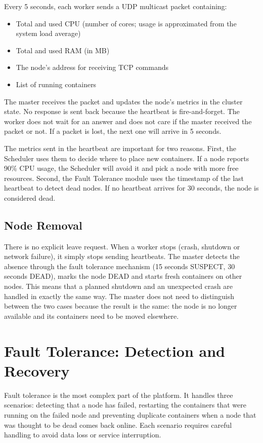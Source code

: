 Every 5 seconds, each worker sends a UDP multicast packet containing:
\begin{itemize}
    \item Total and used CPU (number of cores; usage is approximated from the system load average)
    \item Total and used RAM (in MB)
    \item The node's address for receiving TCP commands
    \item List of running containers
\end{itemize}

The master receives the packet and updates the node's metrics in the cluster state. No response is sent back because the heartbeat is fire-and-forget. The worker does not wait for an answer and does not care if the master received the packet or not. If a packet is lost, the next one will arrive in 5 seconds.

The metrics sent in the heartbeat are important for two reasons. First, the Scheduler uses them to decide where to place new containers. If a node reports 90\% CPU usage, the Scheduler will avoid it and pick a node with more free resources. Second, the Fault Tolerance module uses the timestamp of the last heartbeat to detect dead nodes. If no heartbeat arrives for 30 seconds, the node is considered dead.

\subsection{Node Removal}

There is no explicit leave request. When a worker stops (crash, shutdown or network failure), it simply stops sending heartbeats. The master detects the absence through the fault tolerance mechanism (15 seconds SUSPECT, 30 seconds DEAD), marks the node DEAD and starts fresh containers on other nodes. This means that a planned shutdown and an unexpected crash are handled in exactly the same way. The master does not need to distinguish between the two cases because the result is the same: the node is no longer available and its containers need to be moved elsewhere.

\section{Fault Tolerance: Detection and Recovery}

Fault tolerance is the most complex part of the platform. It handles three scenarios: detecting that a node has failed, restarting the containers that were running on the failed node and preventing duplicate containers when a node that was thought to be dead comes back online. Each scenario requires careful handling to avoid data loss or service interruption.

